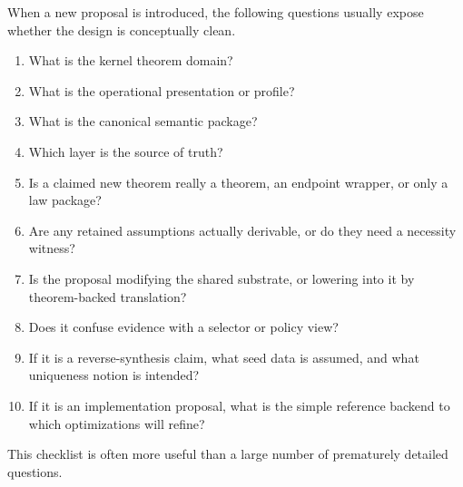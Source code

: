 \documentclass[11pt]{article}
\begin{document}
When a new proposal is introduced, the following questions usually expose whether the design is conceptually clean.

\begin{enumerate}
  \item What is the kernel theorem domain?
  \item What is the operational presentation or profile?
  \item What is the canonical semantic package?
  \item Which layer is the source of truth?
  \item Is a claimed new theorem really a theorem, an endpoint wrapper, or only a law package?
  \item Are any retained assumptions actually derivable, or do they need a necessity witness?
  \item Is the proposal modifying the shared substrate, or lowering into it by theorem-backed translation?
  \item Does it confuse evidence with a selector or policy view?
  \item If it is a reverse-synthesis claim, what seed data is assumed, and what uniqueness notion is intended?
  \item If it is an implementation proposal, what is the simple reference backend to which optimizations will refine?
\end{enumerate}

This checklist is often more useful than a large number of prematurely detailed questions.
\end{document}
